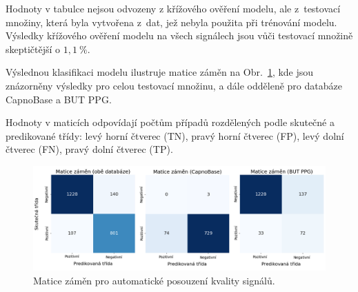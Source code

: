 \begin{table}[!ht]
	\centering
	\caption[Srovnání klasifikační přesnosti automatického hodnocení kvality]{Souhrnné metriky přesnosti klasifikace automatického posouzení kvality signálů pro jednotlivé databáze a třídy.}
	\label{tab:vysledky_kvalita}
\end{table}
Hodnoty v tabulce nejsou odvozeny z křížového ověření modelu, ale z~testovací množiny, která byla vytvořena z~dat, jež nebyla použita při trénování modelu.
Výsledky křížového ověření modelu na všech signálech jsou vůči testovací množině skeptičtější o $1,1~\%$.

Výslednou klasifikaci modelu ilustruje matice záměn na Obr.~\ref{fig:confusion_matrix_kvalita}, kde jsou znázorněny výsledky pro celou testovací množinu, a dále odděleně pro databáze CapnoBase a \acs{BUT PPG}.

Hodnoty v maticích odpovídají počtům případů rozdělených podle skutečné a predikované třídy: levý horní čtverec (\acs{TN}), pravý horní čtverec (\acs{FP}), levý dolní čtverec (\acs{FN}), pravý dolní čtverec (\acs{TP}).

\begin{figure}[ht]
	\centering
	\includegraphics[width=1\textwidth]{./obrazky/vysledky/confusion_matrix_rf.png}
	\caption[Matice záměn pro automatické posouzení kvality signálů]{Matice záměn pro automatické posouzení kvality signálů.}
	\label{fig:confusion_matrix_kvalita}
\end{figure}

